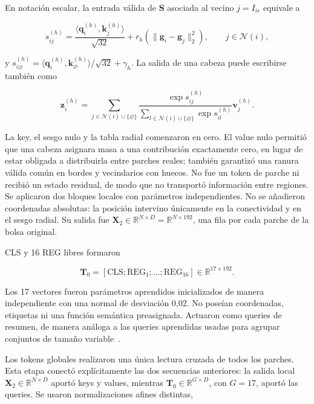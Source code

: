 En notación escalar, la entrada válida de \(\mathbf S\) asociada al vecino
\(j=I_{ir}\) equivale a

\begin{equation}
    s_{ij}^{(h)}=
    \frac{\langle\mathbf q_i^{(h)},\mathbf k_j^{(h)}\rangle}{\sqrt{32}}
    +r_h\!\left(\lVert\mathbf g_i-\mathbf g_j\rVert_2^2\right),
    \qquad j\in\mathcal N(i),
    \label{eq:score-local-mil}
\end{equation}

y \(s_{i\varnothing}^{(h)}=\langle\mathbf q_i^{(h)},
\mathbf k_{\varnothing}^{(h)}\rangle/\sqrt{32}+\gamma_h\). La salida de una
cabeza puede escribirse también como

\begin{equation}
    \mathbf z_i^{(h)}=
    \sum_{j\in\mathcal N(i)\cup\{\varnothing\}}
    \frac{\exp s_{ij}^{(h)}}{
      \sum_{l\in\mathcal N(i)\cup\{\varnothing\}}\exp s_{il}^{(h)}}
    \mathbf v_j^{(h)}.
    \label{eq:softmax-local-con-nulo}
\end{equation}

La key, el sesgo nulo y la tabla radial comenzaron en cero. El value nulo
permitió que una cabeza asignara masa a una contribución exactamente cero, en
lugar de estar obligada a distribuirla entre parches reales; también garantizó
una ranura válida común en bordes y vecindarios con huecos. No fue un token de
parche ni recibió un estado residual, de modo que no transportó información
entre regiones. Se aplicaron dos bloques locales con parámetros independientes.
No se añadieron coordenadas absolutas: la posición intervino únicamente en la
conectividad y en el sesgo radial. Su salida fue
\(\mathbf X_2\in\mathbb R^{N\times D}=\mathbb R^{N\times192}\), una fila por
cada parche de la bolsa original.

CLS y 16 REG libres formaron

\begin{equation}
    \mathbf T_0=[\mathrm{CLS};\mathrm{REG}_1;\ldots;\mathrm{REG}_{16}]
    \in\mathbb{R}^{17\times192}.
    \label{eq:tokens-globales-mil}
\end{equation}

Los 17 vectores fueron parámetros aprendidos inicializados de manera
independiente con una normal de desviación 0,02. No poseían coordenadas,
etiquetas ni una función semántica preasignada. Actuaron como queries de
resumen, de manera análoga a las queries aprendidas usadas para agrupar
conjuntos de tamaño variable~\cite{lee_settransformer_2019}.

Los tokens globales realizaron una única lectura cruzada de todos los parches.
Esta etapa conectó explícitamente las dos secuencias anteriores: la salida local
\(\mathbf X_2\in\mathbb R^{N\times D}\) aportó keys y values, mientras
\(\mathbf T_0\in\mathbb R^{G\times D}\), con \(G=17\), aportó las queries.
Se usaron normalizaciones afines distintas,

